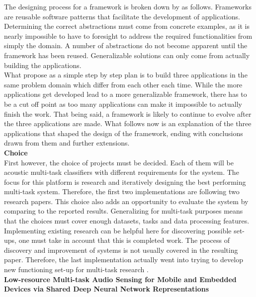 The designing process for a framework is broken down by \cite{roberts1996evolving} as follows. Frameworks are reusable software patterns that facilitate the development of applications. Determining the correct abstractions must come from concrete examples, as it is nearly impossible to have to foresight to address the required functionalities from simply the domain. A number of abstractions do not become apparent until the framework has been reused. Generalizable solutions can only come from actually building the applications. \\

What \citep{roberts1996evolving} propose as a simple step by step plan is to build three applications in the same problem domain which differ from each other each time. While the more applications get developed lead to a more generalizable framework, there has to be a cut off point as too many applications can make it impossible to actually finish the work. That being said, a framework is likely to continue to evolve after the three applications are made. What follows now is an explanation of the three applications that shaped the design of the framework, ending with conclusions drawn from them and further extensions. \\

{\large \textbf{Choice}} \\

First however, the choice of projects must be decided. Each of them will be acoustic multi-task classifiers with different requirements for the system. The focus for this platform is research and iteratively designing the best performing multi-task system. Therefore, the first two implementations are following two research papers. This choice also adds an opportunity to evaluate the system by comparing to the reported results. Generalizing for multi-task purposes means that the choices must cover enough datasets, tasks and data processing features. Implementing existing research can be helpful here for discovering possible set-ups, one must take in account that this is completed work. The process of discovery and improvement of systems is not usually covered in the resulting paper. Therefore, the last implementation actually went into trying to develop new functioning set-up for multi-task research . \\



{\large \textbf{Low-resource Multi-task Audio Sensing for Mobile and Embedded Devices via Shared Deep Neural Network Representations}} \\

